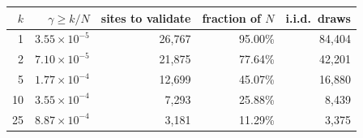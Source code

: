 \begin{tabular}{@{}rrrrr@{}}
\toprule
$k$ & $\gamma\ge k/N$ & sites to validate & fraction of $N$ & i.i.d.\ draws \\
\midrule
1 & $3.55\times10^{-5}$ & 26,767 & 95.00\% & 84,404 \\
2 & $7.10\times10^{-5}$ & 21,875 & 77.64\% & 42,201 \\
5 & $1.77\times10^{-4}$ & 12,699 & 45.07\% & 16,880 \\
10 & $3.55\times10^{-4}$ & 7,293 & 25.88\% & 8,439 \\
25 & $8.87\times10^{-4}$ & 3,181 & 11.29\% & 3,375 \\
\bottomrule
\end{tabular}
